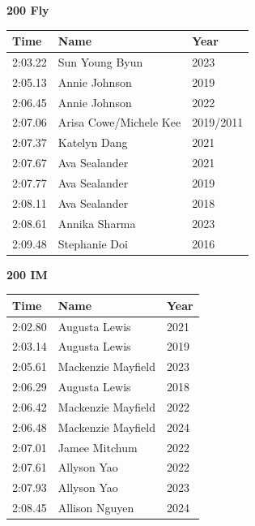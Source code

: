 \vspace{1.2em}
\noindent\begin{minipage}[t]{0.48\textwidth}
\centering
\textbf{\textcolor{teamprimary}{200 Fly}}\par
\vspace{0.5em}
\centering
\small
\renewcommand{\arraystretch}{1.0}
\setlength{\tabcolsep}{4pt}
\begin{tabular}{@{}p{1.8cm}p{3.0cm}p{1.0cm}@{}}
\toprule
\textbf{Time} & \textbf{Name} & \textbf{Year} \\
\midrule
2:03.22 & Sun Young Byun & 2023 \\
2:05.13 & Annie Johnson & 2019 \\
2:06.45 & Annie Johnson & 2022 \\
2:07.06 & Arisa Cowe/Michele Kee & 2019/2011 \\
2:07.37 & Katelyn Dang & 2021 \\
2:07.67 & Ava Sealander & 2021 \\
2:07.77 & Ava Sealander & 2019 \\
2:08.11 & Ava Sealander & 2018 \\
2:08.61 & Annika Sharma & 2023 \\
2:09.48 & Stephanie Doi & 2016 \\
\bottomrule
\end{tabular}
\end{minipage}
\hfill
\begin{minipage}[t]{0.48\textwidth}
\centering
\textbf{\textcolor{teamprimary}{200 IM}}\par
\vspace{0.5em}
\centering
\small
\renewcommand{\arraystretch}{1.0}
\setlength{\tabcolsep}{4pt}
\begin{tabular}{@{}p{1.8cm}p{3.0cm}p{1.0cm}@{}}
\toprule
\textbf{Time} & \textbf{Name} & \textbf{Year} \\
\midrule
2:02.80 & Augusta Lewis & 2021 \\
2:03.14 & Augusta Lewis & 2019 \\
2:05.61 & Mackenzie Mayfield & 2023 \\
2:06.29 & Augusta Lewis & 2018 \\
2:06.42 & Mackenzie Mayfield & 2022 \\
2:06.48 & Mackenzie Mayfield & 2024 \\
2:07.01 & Jamee Mitchum & 2022 \\
2:07.61 & Allyson Yao & 2022 \\
2:07.93 & Allyson Yao & 2023 \\
2:08.45 & Allison Nguyen & 2024 \\
\bottomrule
\end{tabular}
\end{minipage}
